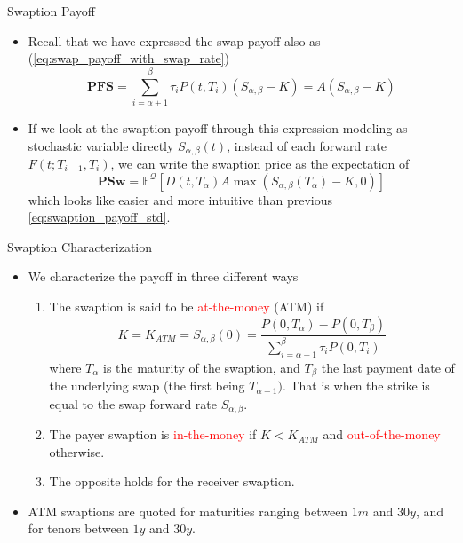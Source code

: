\documentclass{beamer}
\begin{document}
\begin{frame}{Swaption Payoff}
\begin{itemize}
	\item<1-> Recall that we have expressed the swap payoff also as (\cref{eq:swap_payoff_with_swap_rate})
	\begin{equation*}
	\textbf{PFS}=\sum_{i=\alpha+1}^\beta \tau_i P(t,T_i)(S_{\alpha,\beta}-K) = A(S_{\alpha,\beta}-K)
	\end{equation*}
	\item<2-> If we look at the swaption payoff through this expression modeling as stochastic variable directly $S_{\alpha,\beta}(t)$, instead of each forward rate $F(t;T_{i-1},T_i)$, we can write the swaption price as the expectation of
	\begin{equation}
		\textbf{PSw}=\mathbb{E}^{\mathcal{Q}}\left[D(t,T_\alpha)A\max(S_{\alpha,\beta}(T_\alpha)-K, 0)\right]
	\end{equation}
	which looks like easier and more intuitive than previous \cref{eq:swaption_payoff_std}.
\end{itemize}
\end{frame}

\begin{frame}{Swaption Characterization}
	\begin{itemize}	
		\item<1-> We characterize the payoff in three different ways
		\begin{enumerate}
			\item<2-> The swaption is said to be \textcolor{red}{at-the-money} (ATM) if
			\begin{equation*}
				K = K_{ATM} = S_{\alpha,\beta}(0) = \frac{P(0,T_\alpha)-P(0,T_\beta)}{\sum_{i=\alpha+1}^\beta \tau_i P(0,T_i)}
			\end{equation*}
			where $T_\alpha$ is the maturity of the swaption, and $T_\beta$ the last payment date of the underlying swap (the first being $T_{\alpha+1})$. That is when the strike is equal to the swap forward rate $S_{\alpha,\beta}$.
			\item<3-> The payer swaption is \textcolor{red}{in-the-money} if $K<K_{ATM}$ and \textcolor{red}{out-of-the-money} otherwise.
			\item<4-> The opposite holds for the receiver swaption.
		\end{enumerate}
		\item<5-> ATM swaptions are quoted for maturities ranging between $1m$ and $30y$, and for tenors between $1y$ and $30y$.
	\end{itemize}
\end{frame}
\end{document}
